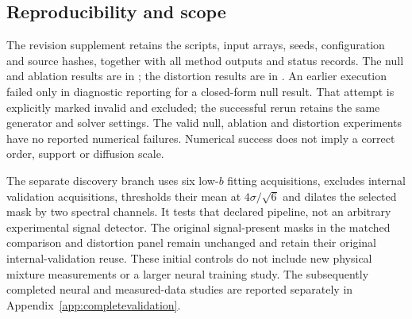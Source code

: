 \subsection{Reproducibility and scope}
The revision supplement retains the scripts, input arrays, seeds, configuration and source hashes, together with all method outputs and status records. The null and ablation results are in ; the distortion results are in . An earlier execution failed only in diagnostic reporting for a closed-form null result. That attempt is explicitly marked invalid and excluded; the successful rerun retains the same generator and solver settings. The valid null, ablation and distortion experiments have no reported numerical failures. Numerical success does not imply a correct order, support or diffusion scale.

The separate discovery branch uses six low-$b$ fitting acquisitions, excludes internal validation acquisitions, thresholds their mean at $4\sigma/\sqrt{6}$ and dilates the selected mask by two spectral channels. It tests that declared pipeline, not an arbitrary experimental signal detector. The original signal-present masks in the matched comparison and distortion panel remain unchanged and retain their original internal-validation reuse. These initial controls do not include new physical mixture measurements or a larger neural training study. The subsequently completed neural and measured-data studies are reported separately in Appendix~\ref{app:completevalidation}.
